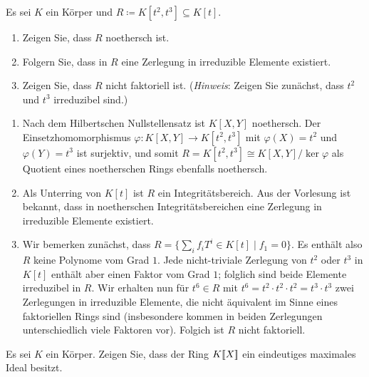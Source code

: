 \begin{question}
  Es sei $K$ ein Körper und $R \coloneqq K[t^2, t^3] \subseteq K[t]$.
  \begin{enumerate}
    \item
      Zeigen Sie, dass $R$ noethersch ist.
    \item
      Folgern Sie, dass in $R$ eine Zerlegung in irreduzible Elemente existiert.
    \item
      Zeigen Sie, dass $R$ nicht faktoriell ist.
      (\emph{Hinweis}:
       Zeigen Sie zunächst, dass $t^2$ und $t^3$ irreduzibel sind.)
  \end{enumerate}
\end{question}


\begin{solution}
  \begin{enumerate}
    \item
      Nach dem Hilbertschen Nullstellensatz ist $K[X,Y]$ noethersch.
      Der Einsetzhomomorphismus $\varphi \colon K[X,Y] \to K[t^2, t^3]$ mit $\varphi(X) = t^2$ und $\varphi(Y) = t^3$ ist surjektiv, und somit $R = K[t^2, t^3] \cong K[X,Y]/\ker \varphi$ als Quotient eines noetherschen Rings ebenfalls noethersch.
    \item
      Als Unterring von $K[t]$ ist $R$ ein Integritätsbereich.
      Aus der Vorlesung ist bekannt, dass in noetherschen Integritätsbereichen eine Zerlegung in irreduzible Elemente existiert.
    \item
      Wir bemerken zunächst, dass $R = \{\sum_i f_i T^i \in K[t] \mid f_1 = 0\}$.
      Es enthält also $R$ keine Polynome vom Grad $1$.
      Jede nicht-triviale Zerlegung von $t^2$ oder $t^3$ in $K[t]$ enthält aber einen Faktor vom Grad $1$;
      folglich sind beide Elemente irreduzibel in $R$.
      Wir erhalten nun für $t^6 \in R$ mit $t^6 = t^2 \cdot t^2 \cdot t^2 = t^3 \cdot t^3$ zwei Zerlegungen in irreduzible Elemente, die nicht äquivalent im Sinne eines faktoriellen Rings sind (insbesondere kommen in beiden Zerlegungen unterschiedlich viele Faktoren vor).
      Folgich ist $R$ nicht faktoriell.
  \end{enumerate}
\end{solution}


\begin{question}
  Es sei $K$ ein Körper.
  Zeigen Sie, dass der Ring $K[\![X]\!]$ ein eindeutiges maximales Ideal besitzt.
\end{question}



